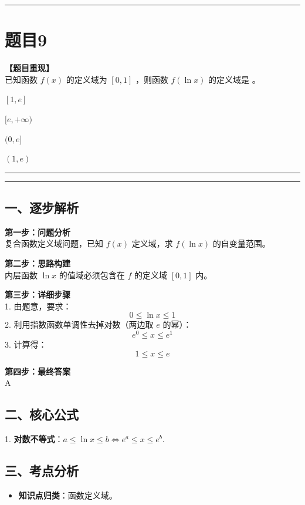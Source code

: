 \documentclass[12pt, a4paper]{ctexart}
\newcommand{\TopSeparator}{
    \par\noindent\rule{\textwidth}{1.5pt}\vspace{0.5em} %
}
\newcommand{\AnalysisSeparator}{
    \par\noindent\rule{\textwidth}{0.5pt}\vspace{0.2em}\hrule\vspace{0.5em} %
}
\newenvironment{RedAnalysis}{
    \par
    \color{red} %
}{
    \par
    \color{black} %
}
\newcommand{\choicesFour}[4]{
    \begin{enumerate}[label=\Alph*., itemsep=0pt, parsep=0pt, topsep=5pt, labelsep=0.5em]
        \begin{minipage}{0.22\linewidth} \item #1 \end{minipage}
        \begin{minipage}{0.22\linewidth} \item #2 \end{minipage}
        \begin{minipage}{0.22\linewidth} \item #3 \end{minipage}
        \begin{minipage}{0.22\linewidth} \item #4 \end{minipage}
    \end{enumerate}
}
\begin{document}
\vspace{2em}

\TopSeparator
\section*{题目9}

\textbf{【题目重现】} \\
已知函数 $ f(x) $ 的定义域为 $ [0,1] $ ，则函数 $ f(\ln x) $ 的定义域是 \underline{\hspace{1cm}}。
\choicesFour{$ [1,e] $}{$ [e,+\infty) $}{$ (0,e] $}{$ (1,e) $}

\AnalysisSeparator

\begin{RedAnalysis}

\subsection*{一、逐步解析}

\textbf{第一步：问题分析} \\
复合函数定义域问题，已知 $f(x)$ 定义域，求 $f(\ln x)$ 的自变量范围。

\textbf{第二步：思路构建} \\
内层函数 $\ln x$ 的值域必须包含在 $f$ 的定义域 $[0, 1]$ 内。

\textbf{第三步：详细步骤} \\
1. 由题意，要求：
   \[ 0 \le \ln x \le 1 \]
2. 利用指数函数单调性去掉对数（两边取 $e$ 的幂）：
   \[ e^0 \le x \le e^1 \]
3. 计算得：
   \[ 1 \le x \le e \]

\textbf{第四步：最终答案} \\
A

\subsection*{二、核心公式}
1. \textbf{对数不等式}：$a \le \ln x \le b \iff e^a \le x \le e^b$.

\subsection*{三、考点分析}
\begin{itemize}
    \item \textbf{知识点归类}：函数定义域。
\end{itemize}

\end{RedAnalysis}

\vspace{2em}
\end{document}
